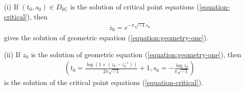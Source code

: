 \documentclass[12pt]{amsart}
\begin{document}
\begin{proposition} \label{propostion-equiv}
(i) If $(t_0,s_0)\in D_{0\mathbb{C}}$ is the solution of critical point equations (\ref{equation-critical}), then 
\begin{align}
    z_0=e^{-\pi\sqrt{-1} s_0}
\end{align}
gives the solution of geometric equation (\ref{equation:geometry-one}). 

(ii) If $z_0$ is the solution of geometric equation (\ref{equation:geometry-one}), then 
\begin{align}
    (t_0=\frac{\log(1+(z_0-z_0^{-1}))}{2\pi\sqrt{-1}}+1,s_0=-\frac{\log z_0}{\pi \sqrt{-1}})
\end{align}
is the solution of the critical point equations (\ref{equation-critical}). 

\end{proposition}
\end{document}
